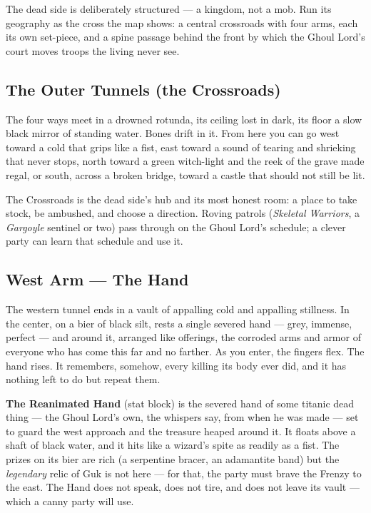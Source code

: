 \documentclass[10pt,twoside]{report}
\begin{document}
\medskip
\noindent The dead side is deliberately structured --- a kingdom, not a mob. Run its geography as the cross the map shows: a central crossroads with four arms, each its own set-piece, and a spine passage behind the front by which the Ghoul Lord's court moves troops the living never see.

\subsection*{The Outer Tunnels (the Crossroads)}
\begin{readaloud}
The four ways meet in a drowned rotunda, its ceiling lost in dark, its floor a slow black mirror of standing water. Bones drift in it. From here you can go west toward a cold that grips like a fist, east toward a sound of tearing and shrieking that never stops, north toward a green witch-light and the reek of the grave made regal, or south, across a broken bridge, toward a castle that should not still be lit.
\end{readaloud}
The Crossroads is the dead side's hub and its most honest room: a place to take stock, be ambushed, and choose a direction. Roving patrols (\emph{Skeletal Warriors}, a \emph{Gargoyle} sentinel or two) pass through on the Ghoul Lord's schedule; a clever party can learn that schedule and use it.

\subsection*{West Arm --- The Hand}
\begin{readaloud}
The western tunnel ends in a vault of appalling cold and appalling stillness. In the center, on a bier of black silt, rests a single severed hand --- grey, immense, perfect --- and around it, arranged like offerings, the corroded arms and armor of everyone who has come this far and no farther. As you enter, the fingers flex. The hand rises. It remembers, somehow, every killing its body ever did, and it has nothing left to do but repeat them.
\end{readaloud}
\textbf{The Reanimated Hand} (stat block) is the severed hand of some titanic dead thing --- the Ghoul Lord's own, the whispers say, from when he was made --- set to guard the west approach and the treasure heaped around it. It floats above a shaft of black water, and it hits like a wizard's spite as readily as a fist. The prizes on its bier are rich (a serpentine bracer, an adamantite band) but the \emph{legendary} relic of Guk is not here --- for that, the party must brave the Frenzy to the east. The Hand does not speak, does not tire, and does not leave its vault --- which a canny party will use.
\end{document}
